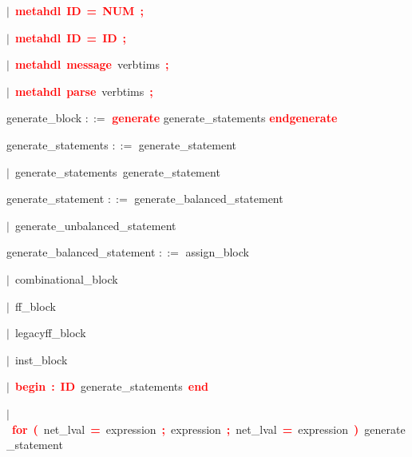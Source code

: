 \mbox{$|$ \textbf{\textcolor{red}{metahdl}} \textbf{\textcolor{red}{ID}} \textbf{\textcolor{red}{=}} \textbf{\textcolor{red}{NUM}} \textbf{\textcolor{red}{;}}}

\mbox{$|$ \textbf{\textcolor{red}{metahdl}} \textbf{\textcolor{red}{ID}} \textbf{\textcolor{red}{=}} \textbf{\textcolor{red}{ID}} \textbf{\textcolor{red}{;}}}

\mbox{$|$ \textbf{\textcolor{red}{metahdl}} \textbf{\textcolor{red}{message}} verbtims \textbf{\textcolor{red}{;}}}

\mbox{$|$ \textbf{\textcolor{red}{metahdl}} \textbf{\textcolor{red}{parse}} verbtims \textbf{\textcolor{red}{;}}}

\vspace{1em}
\noindent
\settowidth{\parindent}{\hspace{4ex}}
generate\_block $::=$\hspace{1ex} \textbf{\textcolor{red}{generate}} generate\_statements \textbf{\textcolor{red}{endgenerate}}

\vspace{1em}
\noindent
\settowidth{\parindent}{\hspace{4ex}}
generate\_statements $::=$\hspace{1ex} generate\_statement

\mbox{$|$ generate\_statements generate\_statement}

\vspace{1em}
\noindent
\settowidth{\parindent}{\hspace{4ex}}
generate\_statement $::=$\hspace{1ex} generate\_balanced\_statement

\mbox{$|$ generate\_unbalanced\_statement}

\vspace{1em}
\noindent
\settowidth{\parindent}{\hspace{4ex}}
generate\_balanced\_statement $::=$\hspace{1ex} assign\_block

\mbox{$|$ combinational\_block}

\mbox{$|$ ff\_block}

\mbox{$|$ legacyff\_block}

\mbox{$|$ inst\_block}

\mbox{$|$ \textbf{\textcolor{red}{begin}} \textbf{\textcolor{red}{:}} \textbf{\textcolor{red}{ID}} generate\_statements \textbf{\textcolor{red}{end}}}

\mbox{$|$ \textbf{\textcolor{red}{for}} \textbf{\textcolor{red}{(}} net\_lval \textbf{\textcolor{red}{=}} expression \textbf{\textcolor{red}{;}} expression \textbf{\textcolor{red}{;}} net\_lval \textbf{\textcolor{red}{=}} expression \textbf{\textcolor{red}{)}} generate\_statement}

